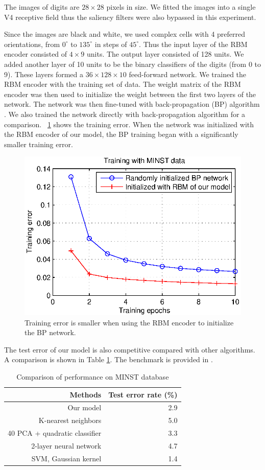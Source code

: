 \documentclass[conference]{IEEEtran}
\begin{document}
The images of digits are $28\times28$ pixels in size.
We fitted the images into a single V4 receptive field thus the saliency filters were also bypassed in this experiment.

Since the images are black and white, we used complex cells with 4 preferred orientations, 
from $0^\circ$ to $135^\circ$ in steps of $45^\circ$.
Thus the input layer of the RBM encoder consisted of $4\times9$ units.
The output layer consisted of 128 units.
We added another layer of 10 units to be the binary classifiers of the digits (from 0 to 9).
These layers formed a $36\times128\times10$ feed-forward network.
We trained the RBM encoder with the training set of data.
The weight matrix of the RBM encoder was then used to initialize 
the weight between the first two layers of the network.
The network was then fine-tuned with back-propagation (BP) algorithm \cite{rumelhart2002}.
We also trained the network directly with back-propagation algorithm for a comparison.
\figurename~\ref{fig:10} shows the training error.
When the network was initialized with the RBM encoder of our model,
the BP training began with a significantly smaller training error.

\begin{figure}[htp]
\centering
\includegraphics[width=0.7\linewidth]{images/fig10.eps}
\caption{Training error is smaller when using the RBM encoder to initialize the BP network.}
\label{fig:10}
\end{figure}

The test error of our model is also competitive compared with other algorithms.
A comparison is shown in Table \ref{tab:3}.
The benchmark is provided in \cite{lecun1998}.

\begin{table}[h]
\caption{Comparison of performance on MINST database}
\centering
\begin{tabular}{rr}
\toprule
Methods & Test error rate (\%) \\
\midrule
Our model & 2.9 \\
K-nearest neighbors & 5.0 \\
40 PCA + quadratic classifier & 3.3 \\
2-layer neural network & 4.7 \\
SVM, Gaussian kernel & 1.4 \\
\bottomrule
\end{tabular}
\label{tab:3}
\end{table}
\end{document}
